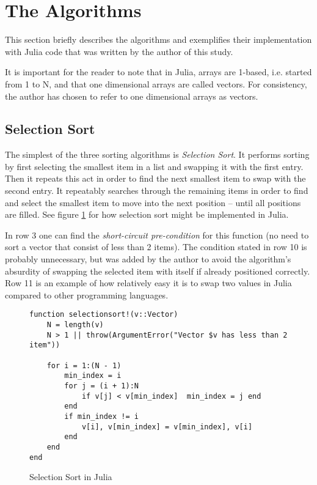 \documentclass[a4paper, 11pt]{article}
\begin{document}
    \section*{The Algorithms}
    This section briefly describes the algorithms and exemplifies their 
    implementation with Julia code that was written by the author of this study. 
    
    It is important for the reader to note that in Julia, arrays are 1-based, 
    i.e. started from 1 to N, and that one dimensional arrays
    are called vectors. For consistency, the author has chosen to refer to 
    one dimensional arrays as vectors.

    \subsection*{Selection Sort}
    The simplest of the three sorting algorithms is \emph{Selection Sort}. 
    It performs sorting by first selecting the smallest item in a list
    and swapping it with the first entry. Then it repeats this act in order to
    find the next smallest item to swap with the second entry. 
    It repeatably searches through the remaining items in order to find and
    select the smallest item to move into the next position -- until all
    positions are filled. See figure \ref{code:selectionsort} for how selection sort
    might be implemented in Julia. 

    In row 3 one can find the \emph{short-circuit pre-condition} for this function 
    (no need to sort a vector that consist of less than 2 items).
    The condition stated in row 10 is probably unnecessary, but was added by the author
    to avoid the algorithm's absurdity of swapping the selected item with itself
    if already positioned correctly. Row 11 is an example of how relatively easy it is 
    to swap two values in Julia compared to other programming languages.

    \begin{figure}[H]
    \begin{verbatim}
function selectionsort!(v::Vector)
    N = length(v)
    N > 1 || throw(ArgumentError("Vector $v has less than 2 item"))

    for i = 1:(N - 1)
        min_index = i
        for j = (i + 1):N
            if v[j] < v[min_index]  min_index = j end
        end
        if min_index != i  
            v[i], v[min_index] = v[min_index], v[i] 
        end
    end
end
    \end{verbatim}
    \caption{Selection Sort in Julia}
    \label{code:selectionsort}
    \end{figure}
    
\end{document}
